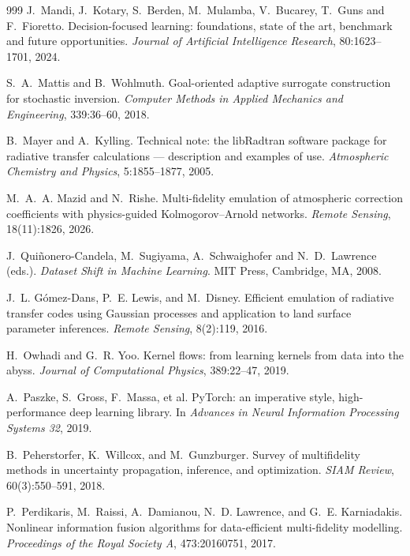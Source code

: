\begin{thebibliography}{999}
J.~Mandi, J.~Kotary, S.~Berden, M.~Mulamba, V.~Bucarey, T.~Guns and F.~Fioretto.
\newblock Decision-focused learning: foundations, state of the art, benchmark and future opportunities.
\newblock \emph{Journal of Artificial Intelligence Research}, 80:1623--1701, 2024.

S.~A.~Mattis and B.~Wohlmuth.
\newblock Goal-oriented adaptive surrogate construction for stochastic inversion.
\newblock \emph{Computer Methods in Applied Mechanics and Engineering}, 339:36--60, 2018.

B.~Mayer and A.~Kylling.
\newblock Technical note: the {libRadtran} software package for radiative transfer calculations --- description and
examples of use.
\newblock \emph{Atmospheric Chemistry and Physics}, 5:1855--1877, 2005.

M.~A.~A. Mazid and N.~Rishe.
\newblock Multi-fidelity emulation of atmospheric correction coefficients with physics-guided Kolmogorov--Arnold
networks.
\newblock \emph{Remote Sensing}, 18(11):1826, 2026.

J.~Qui\~nonero-Candela, M.~Sugiyama, A.~Schwaighofer and N.~D.~Lawrence (eds.).
\newblock \emph{Dataset Shift in Machine Learning}.
\newblock MIT Press, Cambridge, MA, 2008.

J.~L. G\'omez-Dans, P.~E. Lewis, and M.~Disney.
\newblock Efficient emulation of radiative transfer codes using {Gaussian} processes and
application to land surface parameter inferences.
\newblock \emph{Remote Sensing}, 8(2):119, 2016.

H.~Owhadi and G.~R. Yoo.
\newblock Kernel flows: from learning kernels from data into the abyss.
\newblock \emph{Journal of Computational Physics}, 389:22--47, 2019.

A.~Paszke, S.~Gross, F.~Massa, et al.
\newblock PyTorch: an imperative style, high-performance deep learning library.
\newblock In \emph{Advances in Neural Information Processing Systems 32}, 2019.

B.~Peherstorfer, K.~Willcox, and M.~Gunzburger.
\newblock Survey of multifidelity methods in uncertainty propagation, inference, and
optimization.
\newblock \emph{SIAM Review}, 60(3):550--591, 2018.

P.~Perdikaris, M.~Raissi, A.~Damianou, N.~D. Lawrence, and G.~E. Karniadakis.
\newblock Nonlinear information fusion algorithms for data-efficient multi-fidelity modelling.
\newblock \emph{Proceedings of the Royal Society A}, 473:20160751, 2017.


\end{thebibliography}
